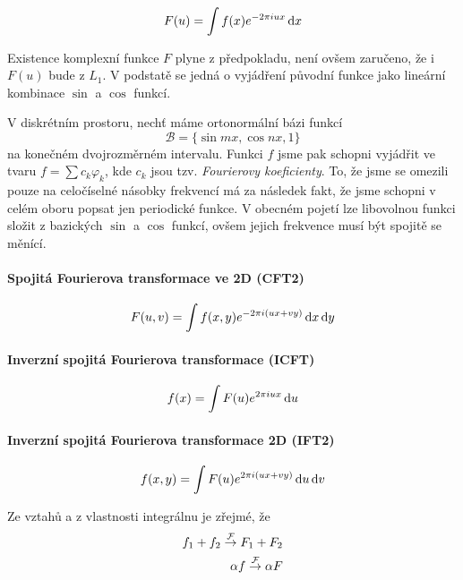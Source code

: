 \begin{equation}
F(u)=\int f(x)e^{-2\pi i u x}\dif x
\end{equation}

Existence komplexní funkce $F$ plyne z předpokladu, není ovšem zaručeno, že i $F(u)$ bude z $L_1$. 
V podstatě se jedná o vyjádření původní
funkce jako lineární kombinace $\sin$ a $\cos$ funkcí.

V diskrétním prostoru, nechť máme ortonormální bázi funkcí 
\begin{equation}
\mathcal{B}=\{\sin mx,\cos nx,1\}
\end{equation}
na konečném
dvojrozměrném intervalu. Funkci $f$ jsme pak schopni
vyjádřit ve tvaru $f=\sum c_k \varphi_k$, kde $c_k$ jsou tzv. \emph{Fourierovy koeficienty}. To, že jsme se omezili pouze na
celočíselné násobky frekvencí má za následek fakt, že jsme schopni v celém oboru popsat jen periodické funkce. V obecném
 pojetí lze libovolnou funkci složit z bazických $\sin$ a $\cos$ funkcí, ovšem jejich frekvence musí být spojitě se měnící.
 
\paragraph{Spojitá Fourierova transformace ve 2D (CFT2)}
\begin{equation}
F(u,v)=\int f(x,y)e^{-2\pi i (ux+vy)}\dif x\dif y
\end{equation}

\paragraph{Inverzní spojitá Fourierova transformace (ICFT)}
\begin{equation}
f(x)=\int F(u)e^{2\pi i u x}\dif u
\end{equation}

\paragraph{Inverzní spojitá Fourierova transformace 2D (IFT2)}
\begin{equation}
f(x,y)=\int F(u)e^{2\pi i (u x+vy)}\dif u\dif v
\end{equation}
 
Ze vztahů a z vlastnosti integrálnu je zřejmé, že 
\begin{align}
f_1+f_2\stackrel{\operatorname{\mathcal{F}}}{\rightarrow} F_1+F_2\\
\alpha f \stackrel{\operatorname{\mathcal{F}}}{\rightarrow} \alpha F
\end{align}

